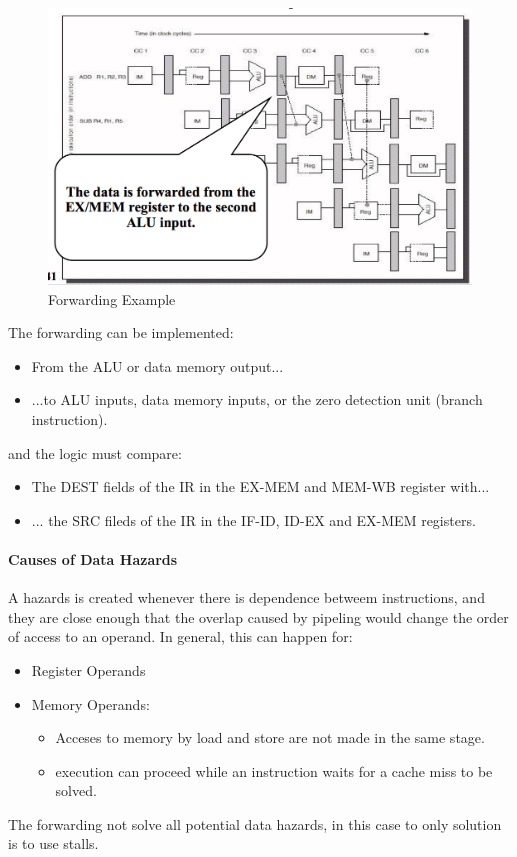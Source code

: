 \documentclass[12pt]{article}
\begin{document}
\begin{figure}[h!]
  \centering
  \includegraphics[width=\linewidth]{images/forward_ex.png}
  \caption{Forwarding Example}
  \label{fig:forward_ex}
\end{figure}

The forwarding can be implemented:
\begin{itemize}
  \item From the ALU or data memory output...
  \item ...to ALU inputs, data memory inputs, or the zero detection unit (branch instruction).
\end{itemize}
and the logic must compare:
\begin{itemize}
  \item The DEST fields of the IR in the EX-MEM and MEM-WB register with...
  \item ... the SRC fileds of the IR in the IF-ID, ID-EX and EX-MEM registers.
\end{itemize}

\paragraph{Causes of Data Hazards} A hazards is created whenever there is dependence betweem instructions, and they are close enough that the overlap caused by pipeling would change the order of access to an operand.
In general, this can happen for:
\begin{itemize}
  \item Register Operands
  \item Memory Operands:
  \begin{itemize}
    \item Acceses to memory by load and store are not made in the same stage.
    \item execution can proceed while an instruction waits for a cache miss to be solved.
  \end{itemize}
\end{itemize}
The forwarding not solve all potential data hazards, in this case to only solution is to use stalls.
\end{document}
